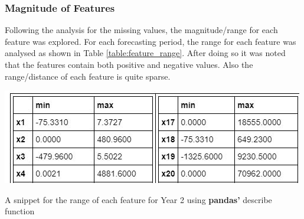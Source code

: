 \subsubsection{Magnitude of Features}\label{sssec:featmagnitude}
\noindent Following the analysis for the missing values, the magnitude/range for each feature was explored. For each forecasting period, the range for each feature was analysed as shown in Table \ref{table:feature_range}. After doing so it was noted that the features contain both positive and negative values. Also the range/distance of each feature is quite sparse. 
\begin{table}[H]
\centering
  \includegraphics[scale = .6]{imgs/feature_range.JPG}
  \caption{A snippet for the range of each feature for Year 2 using \textbf{pandas'} describe function}
  \label{table:feature_range}
\end{table}
 